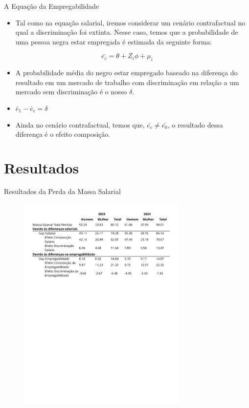 \documentclass[10pt, xcolor=x11names,compress]{beamer}
\begin{document}
	\begin{frame}{A Equação da Empregabilidade}
		\begin{itemize}
			\item Tal como na equação salarial, iremos considerar um cenário contrafactual no qual a discriminação foi extinta. Nesse caso, temos que a probabilidade de uma pessoa negra estar empregada é estimada da seguinte forma:
		\end{itemize}
		\begin{equation}
				\bar{e_{c}} = \theta + Z_{i}\phi + \mu_{i}
		\end{equation}
		\begin{itemize}
			\item A probabilidade média do negro estar empregado baseado na diferença do resultado em um mercado de trabalho com discriminação em relação a um mercado sem discriminação é o nosso $\delta$.
			\item $ \bar{e}_{1} - \bar{e}_{c}= \delta$
			\item Ainda no cenário contrafactual, temos que, $\bar{e_{c}} \neq \bar{e_{0}}$, o resultado dessa diferença é o efeito composição.
		\end{itemize}
	\end{frame}
	
		\section{Resultados}
		\begin{frame}{ Resultados da Perda da Massa Salarial}
		\begin{figure}
			\centering
			\includegraphics[width = 0.75\textwidth]{tables_output/table_massa.pdf}
		\end{figure}
		\end{frame}		
		
\end{document}
